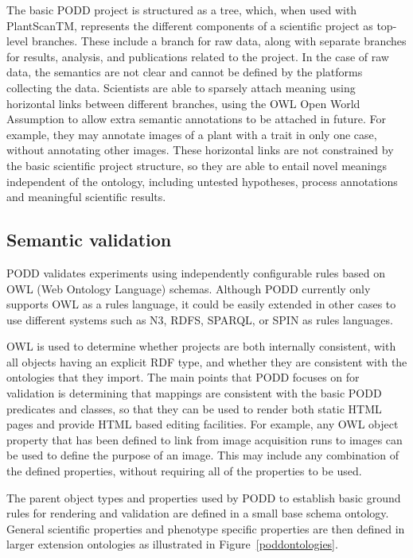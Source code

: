 \documentclass{llncs}
\begin{document}
The basic PODD project is structured as a tree, which, when used with
PlantScanTM, represents the different components of a scientific project as
top-level branches. These include a branch for raw data, along with separate
branches for results, analysis, and publications related to the project. In the
case of raw data, the semantics are not clear and cannot be defined by the
platforms collecting the data. Scientists are able to sparsely attach meaning
using horizontal links between different branches, using the OWL Open World
Assumption to allow extra semantic annotations to be attached in future. For
example, they may annotate images of a plant with a trait in only one case,
without annotating other images. These horizontal links are not constrained by
the basic scientific project structure, so they are able to entail novel
meanings independent of the ontology, including untested hypotheses, process
annotations and meaningful scientific results.


\subsection{Semantic validation}
PODD validates experiments using independently configurable rules based on OWL
(Web Ontology Language) schemas. Although PODD currently only supports OWL as a
rules language, it could be easily extended in other cases to use different
systems such as N3, RDFS, SPARQL, or SPIN as rules languages. 


OWL is used to determine whether projects are both internally consistent, with
all objects having an explicit RDF type, and whether they are consistent with
the ontologies that they import. The main points that PODD focuses on for
validation is determining that mappings are consistent with the basic PODD
predicates and classes, so that they can be used to render both static HTML
pages and provide HTML based editing facilities. For example, any OWL object
property that has been defined to link from image acquisition runs to images can
be used to define the purpose of an image. This may include any combination of
the defined properties, without requiring all of the properties to be used.


The parent object types and properties used by PODD to establish basic ground
rules for rendering and validation are defined in a small base schema ontology.
General scientific properties and phenotype specific properties are then defined
in larger extension ontologies as illustrated in Figure~\ref{poddontologies}.
\end{document}
